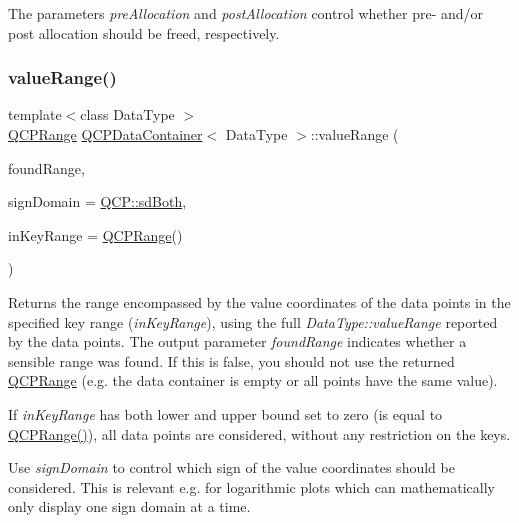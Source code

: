 The parameters {\itshape pre\+Allocation} and {\itshape post\+Allocation} control whether pre-\/ and/or post allocation should be freed, respectively. \mbox{\label{classQCPDataContainer_a35a102dc2424d1228fc374d9313efbe9}} 
\subsubsection{\texorpdfstring{value\+Range()}{valueRange()}}
{\footnotesize\ttfamily template$<$class Data\+Type $>$ \\
\hyperlink{classQCPRange}{Q\+C\+P\+Range} \hyperlink{classQCPDataContainer}{Q\+C\+P\+Data\+Container}$<$ Data\+Type $>$\+::value\+Range (\begin{DoxyParamCaption}\item[{bool \&}]{found\+Range,  }\item[{\hyperlink{namespaceQCP_afd50e7cf431af385614987d8553ff8a9}{Q\+C\+P\+::\+Sign\+Domain}}]{sign\+Domain = {\ttfamily \hyperlink{namespaceQCP_afd50e7cf431af385614987d8553ff8a9aa38352ef02d51ddfa4399d9551566e24}{Q\+C\+P\+::sd\+Both}},  }\item[{const \hyperlink{classQCPRange}{Q\+C\+P\+Range} \&}]{in\+Key\+Range = {\ttfamily \hyperlink{classQCPRange}{Q\+C\+P\+Range}()} }\end{DoxyParamCaption})}

Returns the range encompassed by the value coordinates of the data points in the specified key range ({\itshape in\+Key\+Range}), using the full {\itshape Data\+Type\+::value\+Range} reported by the data points. The output parameter {\itshape found\+Range} indicates whether a sensible range was found. If this is false, you should not use the returned \hyperlink{classQCPRange}{Q\+C\+P\+Range} (e.\+g. the data container is empty or all points have the same value).

If {\itshape in\+Key\+Range} has both lower and upper bound set to zero (is equal to {\ttfamily \hyperlink{classQCPRange}{Q\+C\+P\+Range()}}), all data points are considered, without any restriction on the keys.

Use {\itshape sign\+Domain} to control which sign of the value coordinates should be considered. This is relevant e.\+g. for logarithmic plots which can mathematically only display one sign domain at a time.

